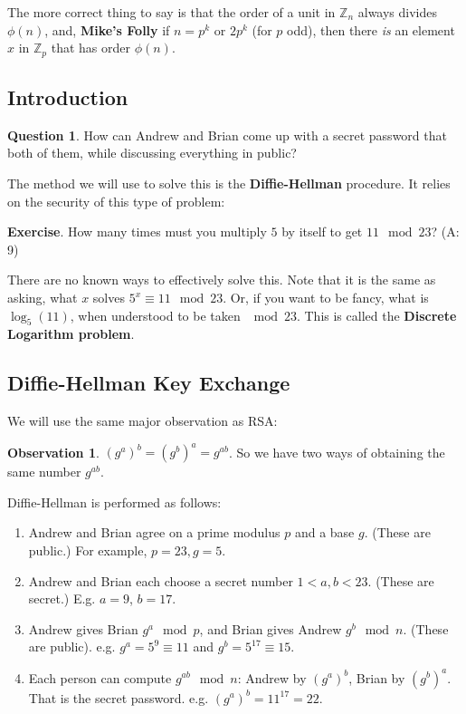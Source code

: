 \documentclass[11pt]{article}
\theoremstyle{definition}
\newtheorem{question}[thm]{Question}
\newtheorem{observation}{Observation}
\numberwithin{thm}{section}
\begin{document}
The more correct thing to say is that the order of a unit in $\mathbb{Z}_n$ always divides $\phi(n)$, and, \textbf{Mike's Folly} if $n = p^k$ or $2p^k$ (for $p$ odd), then there \textit{is} an element $x$ in $\mathbb{Z}_p$ that has order $\phi(n)$.

\subsection{Introduction}

\begin{question} How can Andrew and Brian come up with a secret password that both of them, while discussing everything in public?
\end{question}

The method we will use to solve this is the \textbf{Diffie-Hellman} procedure. It relies on the security of this type of problem:

\textbf{Exercise}. How many times must you multiply $5$ by itself to get $11 \mod 23$? (A: 9)

There are no known ways to effectively solve this. Note that it is the same as asking, what $x$ solves $5^x \equiv 11 \mod 23$. Or, if you want to be fancy, what is $\log_5(11)$, when understood to be taken $\mod 23$. This is called the \textbf{Discrete Logarithm problem}.

\subsection{Diffie-Hellman Key Exchange}

We will use the same major observation as RSA:

\begin{observation} $(g^{a})^b = (g^{b})^a = g^{ab}$. So we have two ways of obtaining the same number $g^{ab}$.
\end{observation}

Diffie-Hellman is performed as follows:

\begin{enumerate}
	\item Andrew and Brian agree on a prime modulus $p$ and a base $g$. (These are public.) For example, $p = 23, g = 5$.
    \item Andrew and Brian each choose a secret number $1< a,b < 23$. (These are secret.) E.g. $a=9$, $b=17$.
    \item Andrew gives Brian $g^a \mod p$, and Brian gives Andrew $g^b \mod n$. (These are public). e.g. $g^a = 5^9 \equiv 11$ and $g^b = 5^{17} \equiv 15$.
    \item Each person can compute $g^{ab} \mod n$: Andrew by $(g^a)^b$, Brian by $(g^b)^a$. That is the secret password. e.g. $(g^a)^b = 11^{17} = 22$.
\end{enumerate}
\end{document}
